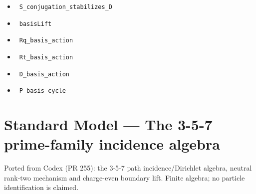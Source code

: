 \documentclass{report}
\theoremstyle{definition}
\begin{document}
\begin{itemize}
  \item {}\leanok\ \texttt{S\_conjugation\_stabilizes\_D}
  \item {}\leanok\ \texttt{basisLift}
  \item {}\leanok\ \texttt{Rq\_basis\_action}
  \item {}\leanok\ \texttt{Rt\_basis\_action}
  \item {}\leanok\ \texttt{D\_basis\_action}
  \item {}\leanok\ \texttt{P\_basis\_cycle}
\end{itemize}

\section{Standard Model --- The 3-5-7 prime-family incidence algebra}
Ported from Codex (PR 255): the 3-5-7 path incidence/Dirichlet algebra, neutral rank-two mechanism and charge-even boundary lift. Finite algebra; no particle identification is claimed.
\end{document}
